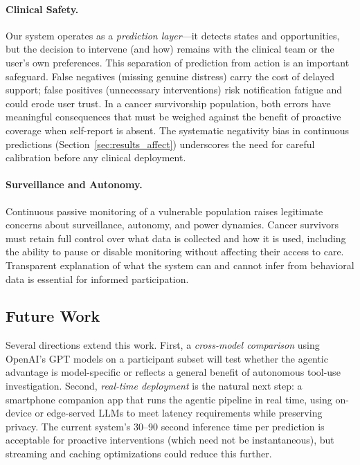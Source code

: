 \documentclass[screen,review,anonymous]{acmart}
\begin{document}
\paragraph{Clinical Safety.}
Our system operates as a \emph{prediction layer}---it detects states and opportunities, but the decision to intervene (and how) remains with the clinical team or the user's own preferences. This separation of prediction from action is an important safeguard. False negatives (missing genuine distress) carry the cost of delayed support; false positives (unnecessary interventions) risk notification fatigue and could erode user trust. In a cancer survivorship population, both errors have meaningful consequences that must be weighed against the benefit of proactive coverage when self-report is absent. The systematic negativity bias in continuous predictions (Section~\ref{sec:results_affect}) underscores the need for careful calibration before any clinical deployment.

\paragraph{Surveillance and Autonomy.}
Continuous passive monitoring of a vulnerable population raises legitimate concerns about surveillance, autonomy, and power dynamics. Cancer survivors must retain full control over what data is collected and how it is used, including the ability to pause or disable monitoring without affecting their access to care. Transparent explanation of what the system can and cannot infer from behavioral data is essential for informed participation.

\subsection{Future Work}

Several directions extend this work. First, a \emph{cross-model comparison} using OpenAI's GPT models on a participant subset will test whether the agentic advantage is model-specific or reflects a general benefit of autonomous tool-use investigation. Second, \emph{real-time deployment} is the natural next step: a smartphone companion app that runs the agentic pipeline in real time, using on-device or edge-served LLMs to meet latency requirements while preserving privacy. The current system's 30--90 second inference time per prediction is acceptable for proactive interventions (which need not be instantaneous), but streaming and caching optimizations could reduce this further.
\end{document}
